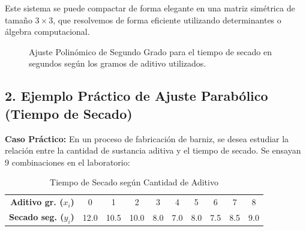 \documentclass[11pt,a4paper]{article}
\begin{document}
    Este sistema se puede compactar de forma elegante en una matriz simétrica de tamaño $3 \times 3$, que resolvemos de forma eficiente utilizando determinantes o álgebra computacional.

    \begin{figure}[htbp]
        \centering
        \caption{Ajuste Polinómico de Segundo Grado para el tiempo de secado en segundos según los gramos de aditivo utilizados.}
        \label{fig:secado}
    \end{figure}
 

\subsection{2. Ejemplo Práctico de Ajuste Parabólico (Tiempo de Secado)}
    \textbf{Caso Práctico:} En un proceso de fabricación de barniz, se desea estudiar la relación entre la cantidad de sustancia aditiva y el tiempo de secado. Se ensayan 9 combinaciones en el laboratorio:
    \begin{table}[h!]
        \centering
        \caption{Tiempo de Secado según Cantidad de Aditivo}
        \begin{tabular}{rccccccccc}
            \toprule
            \textbf{Aditivo gr. ($x_i$)} & 0 & 1 & 2 & 3 & 4 & 5 & 6 & 7 & 8 \\
            \textbf{Secado seg. ($y_i$)} & 12.0 & 10.5 & 10.0 & 8.0 & 7.0 & 8.0 & 7.5 & 8.5 & 9.0 \\
            \bottomrule
        \end{tabular}
    \end{table}
\end{document}
